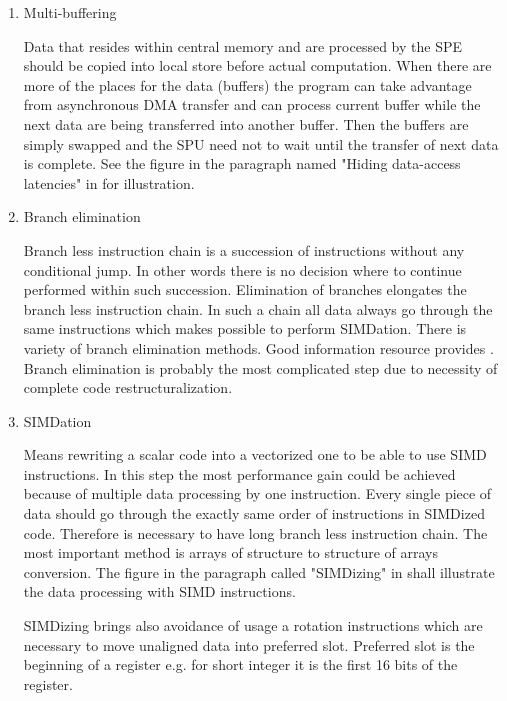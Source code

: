 \begin{enumerate}
\item{Multi-buffering}
\par
Data that resides within central memory and are processed by the SPE should be copied into local store before actual computation.
When there are more of the places for the data (buffers) the program can take advantage from asynchronous DMA transfer and can process current buffer while the next data are being transferred into another buffer.
Then the buffers are simply swapped and the SPU need not to wait until the transfer of next data is complete.
See the figure in the paragraph named "Hiding data-access latencies" in \cite{compilerOptions} for illustration.\\

\item{Branch elimination}
\par
Branch less instruction chain is a succession of instructions without any conditional jump.
In other words there is no decision where to continue performed within such succession.
Elimination of branches elongates the branch less instruction chain.
In such a chain all data always go through the same instructions which makes possible to perform SIMDation.
There is variety of branch elimination methods.
Good information resource provides \cite{cellPerformance}.
Branch elimination is probably the most complicated step due to necessity of complete code restructuralization.

\item{SIMDation}
\par
Means rewriting a scalar code into a vectorized one to be able to use SIMD instructions.
In this step the most performance gain could be achieved because of multiple data processing by one instruction.
Every single piece of data should go through the exactly same order of instructions in SIMDized code.
Therefore is necessary to have long branch less instruction chain.
The most important method is arrays of structure to structure of arrays conversion.
The figure in the paragraph called "SIMDizing" in \cite{compilerOptions} shall illustrate the data processing with SIMD instructions.

\par
SIMDizing brings also avoidance of usage a rotation instructions which are necessary to move unaligned data into preferred slot.
Preferred slot is the beginning of a register e.g. for short integer it is the first 16 bits of the register.


\end{enumerate}
